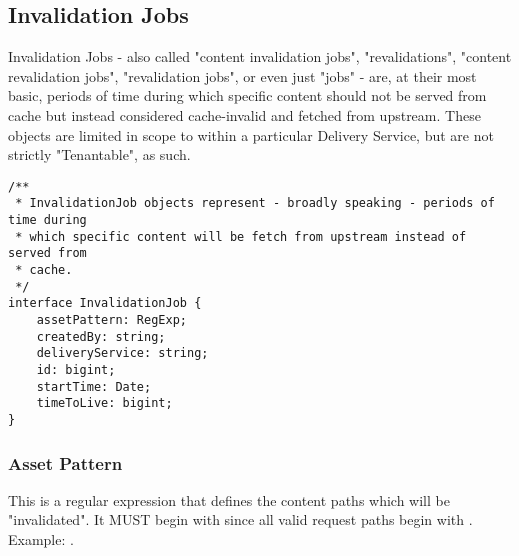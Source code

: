 %
%

\subsection{Invalidation Jobs}
Invalidation Jobs - also called "content invalidation jobs", "revalidations",
"content revalidation jobs", "revalidation jobs", or even just "jobs" - are, at
their most basic, periods of time during which specific content should not be
served from cache but instead considered cache-invalid and fetched from
upstream. These objects are limited in scope to within a particular Delivery
Service, but are not strictly "Tenantable", as such.

\begin{codelisting}
\label{code:datamodel:invalidation-job}
\begin{verbatim}
/**
 * InvalidationJob objects represent - broadly speaking - periods of time during
 * which specific content will be fetch from upstream instead of served from
 * cache.
 */
interface InvalidationJob {
	assetPattern: RegExp;
	createdBy: string;
	deliveryService: string;
	id: bigint;
	startTime: Date;
	timeToLive: bigint;
}
\end{verbatim}
\end{codelisting}

\subsubsection{Asset Pattern}
This is a regular expression that defines the content paths which will be
"invalidated". It MUST begin with \code{/} since all valid request paths begin
with \code{/}. Example: .

